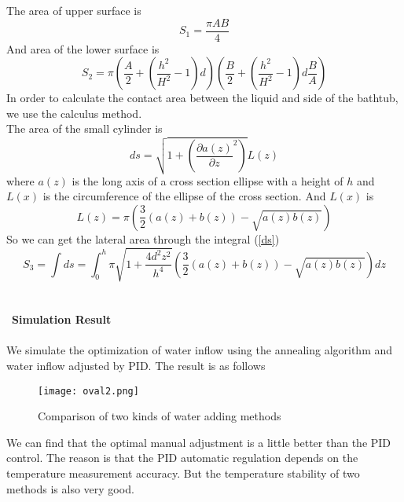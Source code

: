 \documentclass{mcmthesis}
\begin{document}
\indent The area of upper surface is\\
\begin{equation}
S_{1}=\frac{\pi AB}{4}
\end{equation}
\indent And area of the lower surface is\\
\begin{equation}
	S_{2}=\pi (\frac{A}{2}+(\frac{h^{2}}{H^{2}}-1)d)(\frac{B}{2}+(\frac{h^{2}}{H^{2}}-1)d\frac{B}{A})
\end{equation}
\indent In order to calculate the contact area between the liquid and side of the bathtub, we use the calculus method.\\
\indent The area of the small cylinder is 
\begin{equation}
ds=\sqrt{1+(\frac{\partial a(z)}{\partial z}^{2})} L(z)
\label{ds}
\end{equation}
\indent where $a(z)$ is the long axis of a cross section ellipse with a height of $h$ and $L(x)$ is the circumference of the ellipse of the cross section. And $L(x)$ is
\begin{equation}
L(z)=\pi (\frac{3}{2}(a(z)+b(z))-\sqrt{a(z)b(z)})
\end{equation} 
\indent So we can get the lateral area through the integral (\ref{ds})
\begin{equation}
	S_{3}=\int ds=\int_{0}^{h}\pi \sqrt{1+\frac{4d^{2}z^{2}}{h^{4}}}(\frac{3}{2}(a(z)+b(z))-\sqrt{a(z)b(z)})dz
\end{equation}\\\\
\noindent\
\textbf{Simulation Result}\\\\
\indent We simulate the optimization of water inflow using the annealing algorithm  and water inflow adjusted by PID. The result is as follows
\begin{figure}[H]
	\centerline{\texttt{[image: oval2.png]}}
	\caption{Comparison of two kinds of water adding methods}
	\label{circle}	
\end{figure}
\indent We can find that the optimal manual adjustment is a little better than the PID control. The reason is that the PID automatic regulation depends on the temperature measurement accuracy. But the temperature stability of  two methods is also very good.
\end{document}
